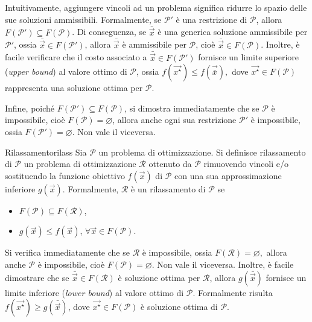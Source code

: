 Intuitivamente, aggiungere vincoli ad un problema significa ridurre lo spazio delle sue soluzioni ammissibili.
Formalmente, se \( \mathcal{P}' \) è una restrizione di \( \mathcal{P} \), allora \( F(\mathcal{P}') \subseteq
F(\mathcal{P}) \). Di conseguenza, se \( \bar{\vec{x}} \) è una generica soluzione ammissibile per \( \mathcal{P}' \),
ossia \( \bar{\vec{x}} \in F(\mathcal{P}')\), allora \( \bar{\vec{x}} \) è ammissibile per \( \mathcal{P} \), cioè \(
\bar{\vec{x}} \in F(\mathcal{P}) \). Inoltre, è facile verificare che il costo associato a \( \bar{\vec{x}} \in
F(\mathcal{P}') \) fornisce
un limite superiore (\textit{upper bound}) al valore ottimo di \( \mathcal{P} \), ossia
\(
    f(\vec{x^{\star}}) \leq f(\vec{\bar{x}}),
\)
dove \( \vec{x^{\star}} \in F(\mathcal{P}) \) rappresenta una soluzione ottima per \( \mathcal{P} \).

Infine, poiché \( F(\mathcal{P}') \subseteq F(\mathcal{P}) \), si dimostra immediatamente che se \( \mathcal{P} \) è
impossibile, cioè \( F(\mathcal{P}) = \varnothing \), allora anche ogni sua restrizione \( \mathcal{P}' \) è
impossibile, ossia \( F(\mathcal{P}') = \varnothing \). Non vale il viceversa.

\begin{defbox}{Rilassamento}{rilass}
    Sia \( \mathcal{P} \) un problema di ottimizzazione. Si definisce rilassamento di \( \mathcal{P} \) un problema di
    ottimizzazione \( \mathcal{R} \) ottenuto da \( \mathcal{P} \) rimuovendo vincoli e/o sostituendo la funzione
    obiettivo \( f(\vec{x}) \) di \( \mathcal{P} \) con una sua approssimazione inferiore \( g(\vec{x}) \). Formalmente,
    \( \mathcal{R} \) è un rilassamento di \( \mathcal{P} \) se
    \begin{itemize}
        \item \( F(\mathcal{P}) \subseteq F(\mathcal{R}) \),
        \item \( g(\vec{x}) \leq f(\vec{x}) \), \( \forall \vec{x} \in F(\mathcal{P}) \).
    \end{itemize}
\end{defbox}
Si verifica immediatamente che se \( \mathcal{R} \) è impossibile, ossia
\(
    F(\mathcal{R}) = \varnothing,
\)
allora anche \( \mathcal{P} \) è impossibile, cioè \( F(\mathcal{P}) = \varnothing \). Non vale il viceversa. Inoltre, è
facile dimostrare che se \( \bar{\vec{x}} \in F(\mathcal{R}) \) è soluzione ottima per \( \mathcal{R} \), allora \(
g(\bar{\vec{x}}) \) fornisce un limite inferiore (\textit{lower bound}) al valore ottimo di \( \mathcal{P} \).
Formalmente risulta \( f(\vec{x^{\star}}) \geq g(\bar{\vec{x}}) \), dove
\(
    \vec{x^{\star}} \in F(\mathcal{P})
\)
è soluzione ottima di
\(
    \mathcal{P}.
\)

